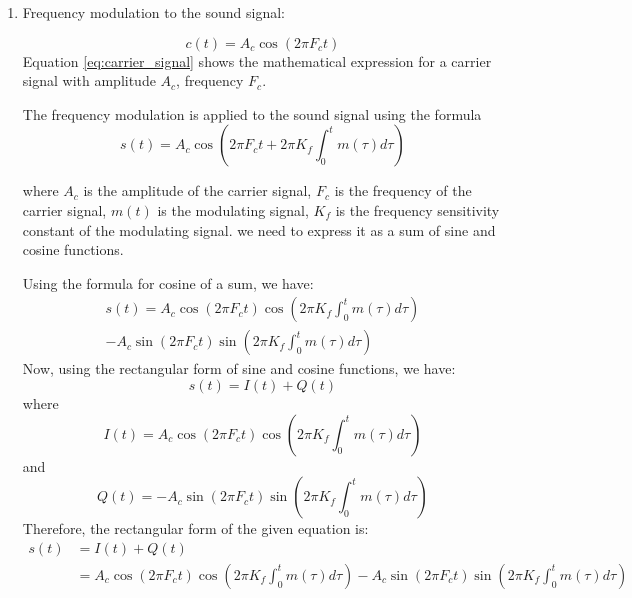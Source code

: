 \documentclass[journal,5pt,twocolumn]{IEEEtran}
\begin{document}
\begin{enumerate}
 \item Frequency modulation to the sound signal:


 \begin{equation}
 c(t) = A_c \cos(2 \pi F_c t )
 \label{eq:carrier_signal} 
 \end{equation}
 Equation \ref{eq:carrier_signal} shows the mathematical expression for a carrier signal with amplitude $A_c$, frequency $F_c$. 
 
 The frequency modulation is applied to the sound signal using the formula
 \begin{equation}
 s(t) = A_c \cos \left(2 \pi F_c t +2\pi K_{f} \int_{0}^t m(\tau) d\tau \right) 
 \end{equation}

 where $A_c$ is the amplitude of the carrier signal, $F_c$ is the frequency of the carrier signal, $m(t)$ is the modulating signal, $K_{f}$ is the frequency sensitivity constant of the modulating signal.
 \iffalse
 we need to express it as a sum of sine and cosine functions.

Using the formula for cosine of a sum, we have:
\begin{align}
s(t) = A_c \cos \left(2 \pi F_c t \right) \cos \left( 2 \pi K_f \int_0^t m(\tau) d\tau \right)\\ - A_c \sin \left(2 \pi F_c t \right) \sin \left( 2 \pi K_f \int_0^t m(\tau) d\tau \right)
\end{align}
Now, using the rectangular form of sine and cosine functions, we have:
\begin{equation}
s(t) = I(t) + Q(t)
\end{equation}
where
\begin{equation}
I(t) = A_c \cos \left(2 \pi F_c t \right) \cos \left( 2 \pi K_f \int_0^t m(\tau) d\tau \right)
\end{equation}
and
\begin{equation}
Q(t) = - A_c \sin \left(2 \pi F_c t \right) \sin \left( 2 \pi K_f \int_0^t m(\tau) d\tau \right)
\end{equation}
Therefore, the rectangular form of the given equation is:
\begin{align}
s(t) &= I(t) + Q(t) 
\\&= A_c \cos \left(2 \pi F_c t \right) \cos \left( 2 \pi K_f \int_0^t m(\tau) d\tau \right) - A_c \sin \left(2 \pi F_c t \right) \sin \left( 2 \pi K_f \int_0^t m(\tau) d\tau \right)
 \end{align}
 

\end{enumerate}
\end{document}
